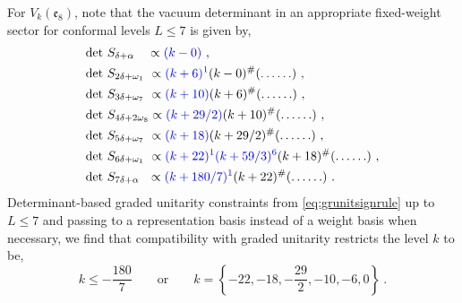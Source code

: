 For $V_k(\mathfrak{e}_8)$, note that the vacuum determinant in an appropriate fixed-weight sector for conformal levels $L \leqslant 7$ is given by, 
\begin{equation} \label{eq:lowlevele8det1to7}
\begin{split}
    &\text{det}~S_{\delta + \alpha} \ \ \ \propto \textcolor{blue}{(k - 0)}~, \\
    &\text{det}~S_{2\delta + \omega_1} \ \propto \textcolor{blue}{(k + 6)^1}(k - 0)^{\#} (\ldots \ldots)~, \\ 
    &\text{det}~S_{3\delta + \omega_7} \ \propto \textcolor{blue}{(k + 10)} (k + 6)^{\#} (\ldots \ldots)~, \\
    &\text{det}~S_{4\delta + 2\omega_8} \propto \textcolor{blue}{(k + 29/2)} (k + 10 )^{\#} (\ldots \ldots)~, \\
    &\text{det}~S_{5\delta + \omega_7} \ \propto \textcolor{blue}{(k + 18)} (k + 29/2)^{\#} (\ldots \ldots)~, \\
    &\text{det}~S_{6\delta + \omega_1} \ \propto \textcolor{blue}{(k + 22)^{1}(k + 59/3)^6}(k+18)^{\#} (\ldots \ldots)~, \\
    &\text{det}~S_{7\delta + \alpha} \ \ \propto \textcolor{blue}{(k + 180/7)^1}(k+22)^{\#} (\ldots \ldots)~.
\end{split}
\end{equation}
Determinant-based graded unitarity constraints from \eqref{eq:grunitsignrule} up to $L \leqslant 7$ and passing to a representation basis instead of a weight basis when necessary, we find that compatibility with graded unitarity restricts the level $k$ to be,
\begin{equation} \label{eq:e8lowlevelconst}
    k \leqslant -\frac{180}{7} \qquad \text{or} \qquad k = \left\{-22, -18, -\frac{29}{2}, -10, -6, 0 \right\}~.
\end{equation}

